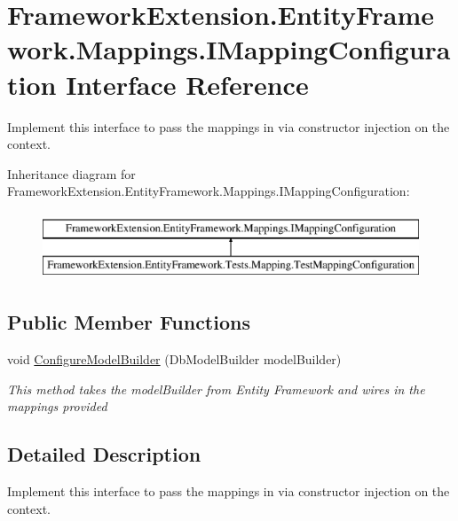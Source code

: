 \hypertarget{interface_framework_extension_1_1_entity_framework_1_1_mappings_1_1_i_mapping_configuration}{\section{Framework\-Extension.\-Entity\-Framework.\-Mappings.\-I\-Mapping\-Configuration Interface Reference}
\label{interface_framework_extension_1_1_entity_framework_1_1_mappings_1_1_i_mapping_configuration}
}


Implement this interface to pass the mappings in via constructor injection on the context.  


Inheritance diagram for Framework\-Extension.\-Entity\-Framework.\-Mappings.\-I\-Mapping\-Configuration\-:\begin{figure}[H]
\begin{center}
\leavevmode
\includegraphics[height=2.000000cm]{interface_framework_extension_1_1_entity_framework_1_1_mappings_1_1_i_mapping_configuration}
\end{center}
\end{figure}
\subsection*{Public Member Functions}
\begin{DoxyCompactItemize}
\item 
void \hyperlink{interface_framework_extension_1_1_entity_framework_1_1_mappings_1_1_i_mapping_configuration_a4c3e96e66c2a5c926b2cf6d60d7289a6}{Configure\-Model\-Builder} (Db\-Model\-Builder model\-Builder)
\begin{DoxyCompactList}\small\item\em This method takes the model\-Builder from Entity Framework and wires in the mappings provided \end{DoxyCompactList}\end{DoxyCompactItemize}


\subsection{Detailed Description}
Implement this interface to pass the mappings in via constructor injection on the context. 




